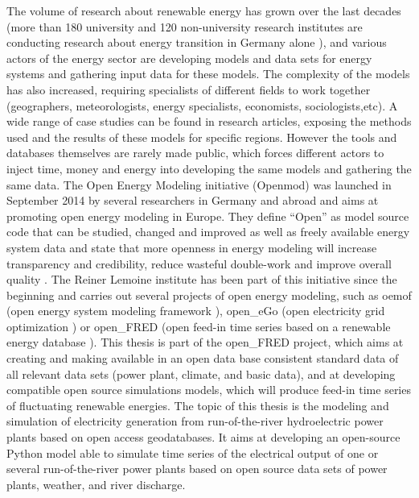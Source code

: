 The volume of research about renewable energy has grown over the last decades (more than 180 university and 120 non-university research institutes are conducting research about energy transition in Germany alone \cite{bmbf_energiewende}), and various actors of the energy sector are developing models and data sets for energy systems and gathering input data for these models. The complexity of the models has also increased, requiring specialists of different fields to work together (geographers, meteorologists, energy specialists, economists, sociologists,etc). A wide range of case studies can be found in research articles, exposing the methods used and the results of these models for specific regions. However the tools and databases themselves are rarely made public, which forces different actors to inject time, money and energy into developing the same models and gathering the same data. \newline
The Open Energy Modeling initiative (Openmod) was launched in September 2014 by several researchers in Germany and abroad \cite{openmod_workshop} and aims at promoting open energy modeling in Europe. They define “Open” as model source code that can be studied, changed and improved as well as freely available energy system data and state that more openness in energy modeling will increase transparency and credibility, reduce wasteful double-work and improve overall quality \cite{openmod_manifesto}. \newline
The Reiner Lemoine institute has been part of this initiative since the beginning and  carries out several projects of open energy modeling, such as oemof (open energy system modeling framework \cite{rli_oemof}), open\_eGo (open electricity grid optimization \cite{rli_openego}) or open\_FRED (open feed-in time series based on a renewable energy database \cite{rli_openfred}). This thesis is part of the open\_FRED project, which aims at creating and making available in an open data base consistent standard data of all relevant data sets (power plant, climate, and basic data), and at developing compatible open source simulations models, which will produce feed-in time series of fluctuating renewable energies. \newline
The topic of this thesis is the modeling and simulation of electricity generation from run-of-the-river hydroelectric power plants based on open access geodatabases. It aims at developing an open-source Python model able to simulate time series of the electrical output of one or several run-of-the-river power plants based on open source data sets of power plants, weather, and river discharge.

